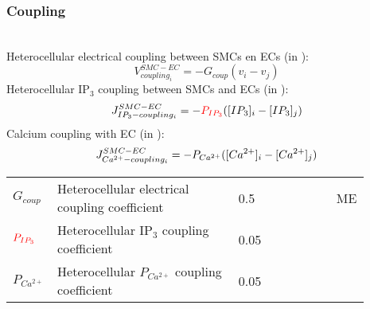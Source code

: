 \documentclass[fleqn]{report}
\numberwithin{equation}{section}
\numberwithin{equation}{section}
\begin{document}
 			\subsubsection*{Coupling}~\\
 			Heterocellular electrical coupling between SMCs en ECs (in \mVs):
 			\begin{equation} \label{eq:Vcouplingi}
 			V_{coupling_{i}}^{SMC-EC}= -G_{coup}(v_{i}-v_{j})
 			\end{equation}
 			Heterocellular IP$_{3}$ coupling between SMCs and ECs (in \uMs):
 			\begin{equation} \label{eq:JIP3couplingi}
 			J_{IP_{3}-coupling_{i}}^{SMC-EC}= -\textcolor{red}{P_{IP_{3}}}([IP_{3}]_{i}-[IP_{3}]_{j})
 			\end{equation}
 			Calcium coupling with EC (in \uMs):
 			\begin{equation} \label{eq:JCAcouplingi}
 			J_{Ca^{2+}-coupling_{i}}^{SMC-EC}= -P_{Ca^{2+}}([Ca^{2+}]_{i}-[Ca^{2+}]_{j})
 			\end{equation}
 
 			\begin{table}[h!]
 			\centering
 			\begin{tabular}{ p{0.09\linewidth}  >{\footnotesize} p{0.5\linewidth}  >{\footnotesize} p{0.27\linewidth} >{\footnotesize} p{0.03\linewidth} }
 			\hline
 			$G_{coup}$      		& Heterocellular electrical coupling coefficient		& 0.5 \pers	& ME \\
 			$\textcolor{red}{P_{IP_{3}}}$      		& Heterocellular IP$_{3}$ coupling coefficient	& 0.05 \pers	&  \cite{Koenigsberger2006} \\
 			$P_{Ca^{2+}}$      		& Heterocellular $P_{Ca^{2+}}$ coupling coefficient	& 0.05 \pers	&  \cite{Koenigsberger2006} \\
 			\hline
 			\end{tabular}
 			\label{tab:JCA3couplingi}
 			\end{table}
 			
\end{document}
